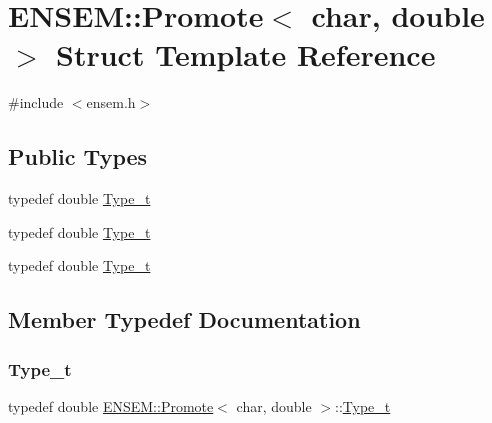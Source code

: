 \hypertarget{structENSEM_1_1Promote_3_01char_00_01double_01_4}{}\section{E\+N\+S\+EM\+:\+:Promote$<$ char, double $>$ Struct Template Reference}
\label{structENSEM_1_1Promote_3_01char_00_01double_01_4}


{\ttfamily \#include $<$ensem.\+h$>$}

\subsection*{Public Types}
\begin{DoxyCompactItemize}
\item 
typedef double \mbox{\hyperlink{structENSEM_1_1Promote_3_01char_00_01double_01_4_a2d74824409365a6005f55424a8314837}{Type\+\_\+t}}
\item 
typedef double \mbox{\hyperlink{structENSEM_1_1Promote_3_01char_00_01double_01_4_a2d74824409365a6005f55424a8314837}{Type\+\_\+t}}
\item 
typedef double \mbox{\hyperlink{structENSEM_1_1Promote_3_01char_00_01double_01_4_a2d74824409365a6005f55424a8314837}{Type\+\_\+t}}
\end{DoxyCompactItemize}


\subsection{Member Typedef Documentation}
\mbox{\label{structENSEM_1_1Promote_3_01char_00_01double_01_4_a2d74824409365a6005f55424a8314837}} 
\subsubsection{\texorpdfstring{Type\_t}{Type\_t}\hspace{0.1cm}{\footnotesize\ttfamily [1/3]}}
{\footnotesize\ttfamily typedef double \mbox{\hyperlink{structENSEM_1_1Promote}{E\+N\+S\+E\+M\+::\+Promote}}$<$ char, double $>$\+::\mbox{\hyperlink{structENSEM_1_1Promote_3_01char_00_01double_01_4_a2d74824409365a6005f55424a8314837}{Type\+\_\+t}}}

